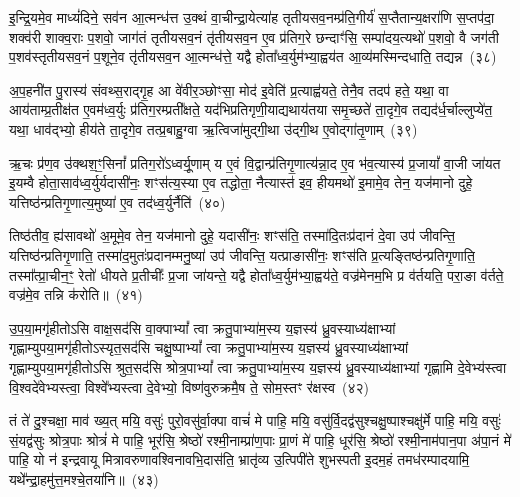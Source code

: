 इ॒न्द्रि॒यमे॒व माध्यं॑दिने॒ सव॑न आ॒त्मन्ध॑त्त उ॒क्थं वा॒चीन्द्रा॒येत्या॑ह तृतीयसव॒नम्प्र॑ति॒गीर्य॑ स॒प्तैतान्य॒क्षरा॑णि स॒प्तप॑दा॒ शक्व॑री शाक्व॒राः प॒शवो॒ जाग॑तं तृतीयसव॒नं तृ॑तीयसव॒न ए॒व प्र॑तिग॒रे छन्दाꣳ॑सि॒ सम्पा॑दय॒त्यथो॑ प॒शवो॒ वै जग॑ती प॒शव॑स्तृतीयसव॒नं प॒शूने॒व तृ॑तीयसव॒न आ॒त्मन्ध॑त्ते॒ यद्वै होता᳚ध्व॒र्युम॑भ्या॒ह्वय॑त आ॒व्य॑मस्मिन्दधाति॒ तद्यन्न~(३८)

अ॒प॒हनी॑त पु॒रास्य॑ संवथ्स॒राद्गृ॒ह आ वे॑वीर॒ञ्छोꣳसा॒ मोद॑ इ॒वेति॑ प्र॒त्याह्व॑यते॒ तेनै॒व तदप॑ हते॒ यथा॒ वा आय॑ताम्प्र॒तीक्ष॑त ए॒वम॑ध्व॒र्युः प्र॑तिग॒रम्प्रती᳚क्षते॒ यद॑भिप्रतिगृणी॒याद्यथाय॑तया समृ॒च्छते॑ ता॒दृगे॒व तद्यद॑र्ध॒र्चाल्लुप्ये॑त॒ यथा॒ धाव॑द्भ्यो॒ हीय॑ते ता॒दृगे॒व तत्प्र॒बाहु॒ग्वा ऋ॒त्विजा॑मुद्गी॒था उ॑द्गी॒थ ए॒वोद्गा॑तृ॒णाम्~(३९)

ऋ॒चः प्र॑ण॒व उ॑क्थश॒ꣳ॒सिनां᳚ प्रतिग॒रो॑\-ऽध्वर्यू॒णाम् य ए॒वं वि॒द्वान्प्र॑तिगृ॒णात्य॑न्ना॒द ए॒व भ॑व॒त्यास्य॑ प्र॒जायां᳚ वा॒जी जा॑यत इ॒यम्वै होता॒साव॑ध्व॒र्युर्यदासी॑नः॒ शꣳस॑त्य॒स्या ए॒व तद्धोता॒ नैत्यास्त॑ इव॒ हीयमथो॑ इ॒मामे॒व तेन॒ यज॑मानो दुहे॒ यत्तिष्ठ॑न्प्रतिगृ॒णात्य॒मुष्या॑ ए॒व तद॑ध्व॒र्युर्नैति॑~(४०)

तिष्ठ॑तीव॒ ह्य॑सावथो॑ अ॒मूमे॒व तेन॒ यज॑मानो दुहे॒ यदासी॑नः॒ शꣳस॑ति॒ तस्मा॑दि॒तःप्र॑दानं दे॒वा उप॑ जीवन्ति॒ यत्तिष्ठ॑न्प्रतिगृ॒णाति॒ तस्मा॑द॒मुतः॑प्रदानम्मनु॒ष्या॑ उप॑ जीवन्ति॒ यत्प्राङासी॑नः॒ शꣳस॑ति प्र॒त्यङ्तिष्ठ॑न्प्रतिगृ॒णाति॒ तस्मा᳚त्प्रा॒चीन॒ꣳ॒ रेतो॑ धीयते प्र॒तीचीः᳚ प्र॒जा जा॑यन्ते॒ यद्वै होता᳚ध्व॒र्युम॑भ्या॒ह्वय॑ते॒ वज्र॑मेनम॒भि प्र व॑र्तयति॒ परा॒ङा व॑र्तते॒ वज्र॑मे॒व तन्नि क॑रोति॥~(४१)

{\anuvakamend[{सव॑ने॒ वज्र॑म॒न्तर्ध॑त्ते॒ त्रीण्ये॒तान्य॒क्षरा॑णीन्द्रि॒यम्माध्य॑न्दिन॒ꣳ॒ सव॑न॒न्नोद्गा॑तृ॒णाम॑ध्व॒र्युर्नैति॑ वर्तयत्य॒ष्टौ च॑}]}%

उ॒प॒या॒मगृ॑हीतो\-ऽसि वाक्ष॒सद॑सि वा॒क्पा\-भ्यां᳚ त्वा क्रतु॒पाभ्या॑म॒स्य य॒ज्ञस्य॑ ध्रु॒वस्याध्य॑क्षाभ्यां गृह्णाम्युपया॒मगृ॑हीतो\-ऽस्यृत॒सद॑सि चक्षु॒ष्पा\-भ्यां᳚ त्वा क्रतु॒पाभ्या॑म॒स्य य॒ज्ञस्य॑ ध्रु॒वस्याध्य॑क्षाभ्यां गृह्णाम्युपया॒मगृ॑हीतो\-ऽसि श्रुत॒सद॑सि श्रोत्र॒पा\-भ्यां᳚ त्वा क्रतु॒पाभ्या॑म॒स्य य॒ज्ञस्य॑ ध्रु॒वस्याध्य॑क्षाभ्यां गृह्णामि दे॒वेभ्य॑स्त्वा वि॒श्वदे॑वेभ्यस्त्वा॒ विश्वे᳚भ्यस्त्वा दे॒वेभ्यो॒ विष्ण॑वुरुक्रमै॒ष ते॒ सोम॒स्तꣳ र॑क्षस्व~(४२)

तं ते॑ दु॒श्चक्षा॒ माव॑ ख्य॒त् मयि॒ वसुः॑ पुरो॒वसु॑र्वा॒क्पा वाचं॑ मे पाहि॒ मयि॒ वसु॑र्वि॒दद्व॑सुश्चक्षु॒ष्पाश्चक्षु॑र्मे पाहि॒ मयि॒ वसुः॑ सं॒यद्व॑सुः श्रोत्र॒पाः श्रोत्रं॑ मे पाहि॒ भूर॑सि॒ श्रेष्ठो॑ रश्मी॒नाम्प्रा॑ण॒पाः प्रा॒णं मे॑ पाहि॒ धूर॑सि॒ श्रेष्ठो॑ रश्मी॒नाम॑पान॒पा अ॑पा॒नं मे॑ पाहि॒ यो न॑ इन्द्रवायू मित्रावरुणावश्विनावभि॒दास॑ति॒ भ्रातृ॑व्य उ॒त्पिपी॑ते शुभस्पती इ॒दम॒हं तमध॑रम्पादयामि॒ यथे᳚न्द्रा॒हमु॑त्त॒मश्चे॒तया॑नि॥~(४३)

